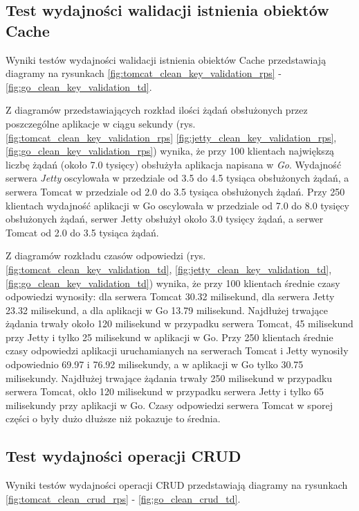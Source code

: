 % 
\clearpage

\subsection{Test wydajności walidacji istnienia obiektów Cache}
Wyniki testów wydajności walidacji istnienia obiektów Cache przedstawiają diagramy na rysunkach \ref{fig:tomcat_clean_key_validation_rps} - \ref{fig:go_clean_key_validation_td}.              

Z diagramów przedstawiających rozkład ilości żądań obsłużonych przez poszczególne aplikacje w ciągu sekundy  (rys. \ref{fig:tomcat_clean_key_validation_rps} \ref{fig:jetty_clean_key_validation_rps}, \ref{fig:go_clean_key_validation_rps}) wynika, że przy 100 klientach największą liczbę żądań (około 7.0 tysięcy) obsłużyła aplikacja napisana w \textsl{Go}. Wydajność serwera \textsl{Jetty} oscylowała w przedziale od 3.5 do 4.5 tysiąca obsłużonych żądań, a serwera Tomcat w przedziale od 2.0 do 3.5 tysiąca obsłużonych żądań. Przy 250 klientach wydajność aplikacji w Go oscylowała w przedziale od 7.0 do 8.0 tysięcy obsłużonych żądań, serwer Jetty obsłużył około 3.0 tysięcy żądań, a serwer Tomcat od 2.0 do 3.5 tysiąca żądań.

Z diagramów rozkładu czasów odpowiedzi (rys. \ref{fig:tomcat_clean_key_validation_td}, \ref{fig:jetty_clean_key_validation_td}, \ref{fig:go_clean_key_validation_td}) wynika, że przy 100 klientach średnie czasy odpowiedzi wynosiły: dla serwera Tomcat 30.32 milisekund, dla serwera Jetty 23.32 milisekund, a dla aplikacji w Go 13.79 milisekund. Najdłużej trwające żądania trwały około 120 milisekund w przypadku serwera Tomcat, 45 milisekund przy Jetty i tylko 25 milisekund w aplikacji w Go. Przy 250 klientach średnie czasy odpowiedzi aplikacji uruchamianych na serwerach Tomcat i Jetty wynosiły odpowiednio 69.97 i 76.92 milisekundy, a w aplikacji w Go tylko 30.75 milisekundy. Najdłużej trwające żądania trwały 250 milisekund w przypadku serwera Tomcat, okło 120 milisekund w przypadku serwera Jetty i tylko 65 milisekundy przy aplikacji w Go. Czasy odpowiedzi serwera Tomcat w sporej części o były dużo dłuższe niż pokazuje to średnia.

% 
\clearpage

\subsection{Test wydajności operacji CRUD}
Wyniki testów wydajności operacji CRUD przedstawiają diagramy na rysunkach \ref{fig:tomcat_clean_crud_rps} - \ref{fig:go_clean_crud_td}.

